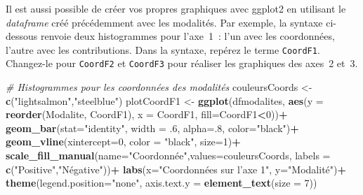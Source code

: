 \documentclass[
  11pt,
  french,
]{book}
\makeatletter
\newenvironment{Shaded}{\begin{snugshade}}{\end{snugshade}}
\newcommand{\CommentTok}[1]{\textcolor[rgb]{0.56,0.35,0.01}{\textit{#1}}}
\newcommand{\DataTypeTok}[1]{\textcolor[rgb]{0.13,0.29,0.53}{#1}}
\newcommand{\DecValTok}[1]{\textcolor[rgb]{0.00,0.00,0.81}{#1}}
\newcommand{\FloatTok}[1]{\textcolor[rgb]{0.00,0.00,0.81}{#1}}
\newcommand{\KeywordTok}[1]{\textcolor[rgb]{0.13,0.29,0.53}{\textbf{#1}}}
\newcommand{\NormalTok}[1]{#1}
\newcommand{\OperatorTok}[1]{\textcolor[rgb]{0.81,0.36,0.00}{\textbf{#1}}}
\newcommand{\StringTok}[1]{\textcolor[rgb]{0.31,0.60,0.02}{#1}}
\newenvironment{kframe}{%
\medskip{}
\setlength{\fboxsep}{.8em}
 \def\at@end@of@kframe{}%
 \ifinner\ifhmode%
  \def\at@end@of@kframe{\end{minipage}}%
  \begin{minipage}{\columnwidth}%
 \fi\fi%
 \def\FrameCommand##1{\hskip\@totalleftmargin \hskip-\fboxsep
 \colorbox{shadecolor}{##1}\hskip-\fboxsep
     \hskip-\linewidth \hskip-\@totalleftmargin \hskip\columnwidth}%
 \MakeFramed {\advance\hsize-\width
   \@totalleftmargin\z@ \linewidth\hsize
   \@setminipage}}%
 {\par\unskip\endMakeFramed%
 \at@end@of@kframe}
\renewenvironment{Shaded}{\begin{kframe}}{\end{kframe}}
\makeatother
\begin{document}
Il est aussi possible de créer vos propres graphiques avec ggplot2 en utilisant le \emph{dataframe} créé précédemment avec les modalités. Par exemple, la syntaxe ci-dessous renvoie deux histogrammes pour l'axe~1~: l'un avec les coordonnées, l'autre avec les contributions. Dans la syntaxe, repérez le terme \texttt{CoordF1}. Changez-le pour \texttt{CoordF2} et \texttt{CoordF3} pour réaliser les graphiques des axes~2 et~3.

\begin{Shaded}
\begin{Highlighting}[]
\CommentTok{# Histogrammes pour les coordonnées des modalités}
\NormalTok{couleursCoords <-}\StringTok{ }\KeywordTok{c}\NormalTok{(}\StringTok{"lightsalmon"}\NormalTok{,}\StringTok{"steelblue"}\NormalTok{)}
\NormalTok{plotCoordF1 <-}\StringTok{ }\KeywordTok{ggplot}\NormalTok{(dfmodalites,}
                      \KeywordTok{aes}\NormalTok{(}\DataTypeTok{y =} \KeywordTok{reorder}\NormalTok{(Modalite, CoordF1),}
                          \DataTypeTok{x =}\NormalTok{ CoordF1, }\DataTypeTok{fill=}\NormalTok{CoordF1}\OperatorTok{<}\DecValTok{0}\NormalTok{))}\OperatorTok{+}
\StringTok{  }\KeywordTok{geom_bar}\NormalTok{(}\DataTypeTok{stat=}\StringTok{"identity"}\NormalTok{, }\DataTypeTok{width =} \FloatTok{.6}\NormalTok{, }\DataTypeTok{alpha=}\NormalTok{.}\DecValTok{8}\NormalTok{, }\DataTypeTok{color=}\StringTok{"black"}\NormalTok{)}\OperatorTok{+}
\StringTok{  }\KeywordTok{geom_vline}\NormalTok{(}\DataTypeTok{xintercept=}\DecValTok{0}\NormalTok{, }\DataTypeTok{color =} \StringTok{"black"}\NormalTok{, }\DataTypeTok{size=}\DecValTok{1}\NormalTok{)}\OperatorTok{+}
\StringTok{  }\KeywordTok{scale_fill_manual}\NormalTok{(}\DataTypeTok{name=}\StringTok{"Coordonnée"}\NormalTok{,}\DataTypeTok{values=}\NormalTok{couleursCoords,}
                    \DataTypeTok{labels =} \KeywordTok{c}\NormalTok{(}\StringTok{"Positive"}\NormalTok{,}\StringTok{"Négative"}\NormalTok{))}\OperatorTok{+}
\StringTok{  }\KeywordTok{labs}\NormalTok{(}\DataTypeTok{x=}\StringTok{"Coordonnées sur l'axe 1"}\NormalTok{, }\DataTypeTok{y=}\StringTok{"Modalité"}\NormalTok{)}\OperatorTok{+}
\StringTok{  }\KeywordTok{theme}\NormalTok{(}\DataTypeTok{legend.position=}\StringTok{"none"}\NormalTok{, }\DataTypeTok{axis.text.y =} \KeywordTok{element_text}\NormalTok{(}\DataTypeTok{size =} \DecValTok{7}\NormalTok{))}


\end{Highlighting}
\end{Shaded}
\end{document}

